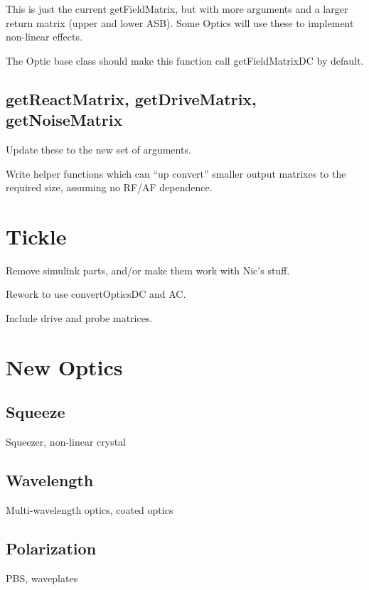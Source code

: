 \documentclass[12pt]{article}
\begin{document}
This is just the current getFieldMatrix, but with more arguments and a larger return matrix (upper and lower ASB).
Some Optics will use these to implement non-linear effects.

The Optic base class should make this function call getFieldMatrixDC by default.

\subsection{getReactMatrix, getDriveMatrix, getNoiseMatrix}

Update these to the new set of arguments.

Write helper functions which can ``up convert'' smaller output matrixes to the required size,
 assuming no RF/AF dependence.

\section{Tickle}

Remove simulink parts, and/or make them work with Nic's stuff.

Rework to use convertOpticsDC and AC.

Include drive and probe matrices.


\section{New Optics}

\subsection{Squeeze}

Squeezer, non-linear crystal

\subsection{Wavelength}

Multi-wavelength optics, coated optics

\subsection{Polarization}

PBS, waveplates

\end{document}
